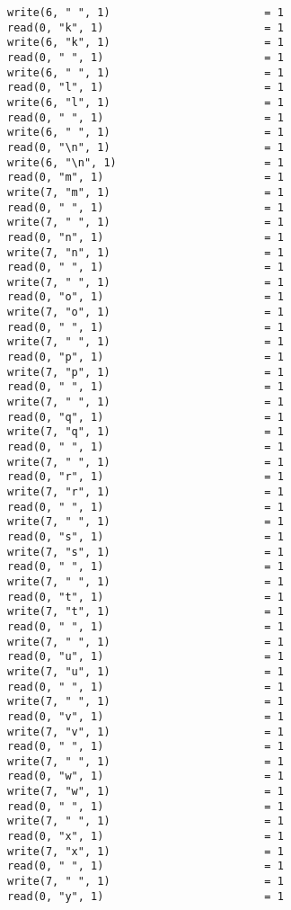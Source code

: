 \begin{verbatim}
write(6, " ", 1)                        = 1
read(0, "k", 1)                         = 1
write(6, "k", 1)                        = 1
read(0, " ", 1)                         = 1
write(6, " ", 1)                        = 1
read(0, "l", 1)                         = 1
write(6, "l", 1)                        = 1
read(0, " ", 1)                         = 1
write(6, " ", 1)                        = 1
read(0, "\n", 1)                        = 1
write(6, "\n", 1)                       = 1
read(0, "m", 1)                         = 1
write(7, "m", 1)                        = 1
read(0, " ", 1)                         = 1
write(7, " ", 1)                        = 1
read(0, "n", 1)                         = 1
write(7, "n", 1)                        = 1
read(0, " ", 1)                         = 1
write(7, " ", 1)                        = 1
read(0, "o", 1)                         = 1
write(7, "o", 1)                        = 1
read(0, " ", 1)                         = 1
write(7, " ", 1)                        = 1
read(0, "p", 1)                         = 1
write(7, "p", 1)                        = 1
read(0, " ", 1)                         = 1
write(7, " ", 1)                        = 1
read(0, "q", 1)                         = 1
write(7, "q", 1)                        = 1
read(0, " ", 1)                         = 1
write(7, " ", 1)                        = 1
read(0, "r", 1)                         = 1
write(7, "r", 1)                        = 1
read(0, " ", 1)                         = 1
write(7, " ", 1)                        = 1
read(0, "s", 1)                         = 1
write(7, "s", 1)                        = 1
read(0, " ", 1)                         = 1
write(7, " ", 1)                        = 1
read(0, "t", 1)                         = 1
write(7, "t", 1)                        = 1
read(0, " ", 1)                         = 1
write(7, " ", 1)                        = 1
read(0, "u", 1)                         = 1
write(7, "u", 1)                        = 1
read(0, " ", 1)                         = 1
write(7, " ", 1)                        = 1
read(0, "v", 1)                         = 1
write(7, "v", 1)                        = 1
read(0, " ", 1)                         = 1
write(7, " ", 1)                        = 1
read(0, "w", 1)                         = 1
write(7, "w", 1)                        = 1
read(0, " ", 1)                         = 1
write(7, " ", 1)                        = 1
read(0, "x", 1)                         = 1
write(7, "x", 1)                        = 1
read(0, " ", 1)                         = 1
write(7, " ", 1)                        = 1
read(0, "y", 1)                         = 1

\end{verbatim}
